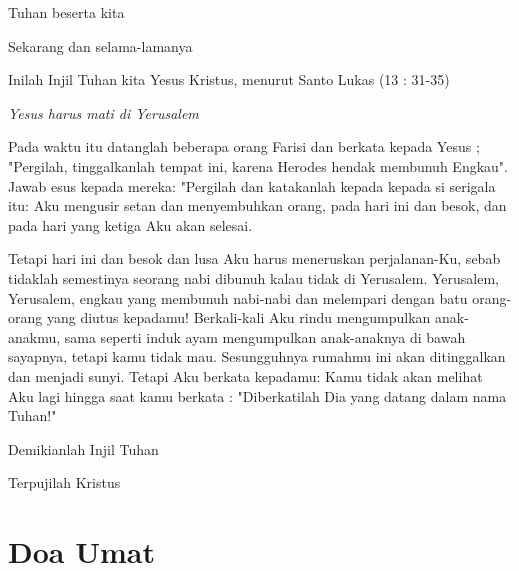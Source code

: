 \documentclass[12pt,a4paper]{article}
\begin{document}
\begin{description}
\item [I]  Tuhan beserta kita 
\item [U]   Sekarang dan selama-lamanya
\item [I]    Inilah Injil Tuhan kita Yesus Kristus, menurut Santo  Lukas (13 : 31-35)

	\textit{Yesus harus mati di Yerusalem}
	
            Pada waktu itu datanglah beberapa orang Farisi dan berkata kepada Yesus ; "Pergilah, tinggalkanlah tempat ini, karena Herodes hendak membunuh Engkau". Jawab esus kepada mereka: "Pergilah dan katakanlah kepada  kepada si serigala itu: Aku mengusir setan dan menyembuhkan orang, pada hari ini dan besok, dan pada hari yang ketiga Aku akan selesai. 

\item Tetapi hari ini dan besok dan lusa Aku harus meneruskan perjalanan-Ku, sebab tidaklah semestinya seorang nabi dibunuh kalau tidak di Yerusalem. Yerusalem, Yerusalem, engkau yang membunuh nabi-nabi dan melempari dengan batu orang-orang yang diutus kepadamu! Berkali-kali Aku rindu mengumpulkan anak-anakmu, sama seperti induk ayam mengumpulkan anak-anaknya di bawah sayapnya, tetapi kamu tidak mau. Sesungguhnya rumahmu ini akan ditinggalkan dan menjadi sunyi. Tetapi Aku berkata kepadamu: Kamu tidak akan melihat Aku lagi hingga saat kamu berkata : "Diberkatilah Dia yang datang dalam nama Tuhan!"

Demikianlah Injil Tuhan

\item [U]    Terpujilah Kristus

\end{description}

\newpage
\section*{Doa Umat}
\end{document}
